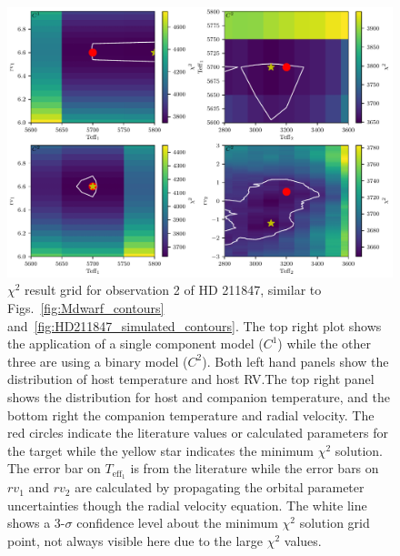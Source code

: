 \documentclass[fleqn,usenatbib]{mnras}
\begin{document}
    \begin{figure}
        \centering
        \includegraphics[width=0.8\hsize]{images/fig5.pdf}
        \caption{\(\chi^2\) result grid for observation 2 of {HD 211847}, similar to Figs.~\ref{fig:Mdwarf_contours} and~\ref{fig:HD211847_simulated_contours}. The top right plot shows the application of a single component model (\(C^1\)) while the other three are using a binary model (\(C^2\)). Both left hand panels show the distribution of host temperature and host RV.\@ The top right panel shows the distribution for host and companion temperature, and the bottom right the companion temperature and radial velocity. The red circles indicate the literature values or calculated parameters for the target while the yellow star indicates the minimum \(\chi^2\) solution. The error bar on \(T_{\textrm{eff}_1}\) is from the literature while the error bars on \({rv}_1\) and \({rv}_2\) are calculated by propagating the orbital parameter uncertainties though the radial velocity equation. The white line shows a 3-\(\sigma\) confidence level about the minimum \(\chi^2\) solution grid point, not always visible here due to the large \(\chi^2\) values.}
        \label{fig:HD211847_result_contours}
    \end{figure}
    
\end{document}
